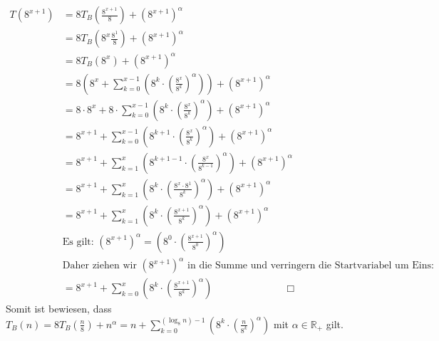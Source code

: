 \documentclass[a4paper]{scrartcl}
\begin{document}
\begin{align*}
T(8^{x+1})&=8T_B(\frac{8^{x+1}}{8})+(8^{x+1})^{\alpha}\\
&=8T_B(8^x\frac{8^{1}}{8})+(8^{x+1})^{\alpha}\\
&=8T_B(8^x)+(8^{x+1})^{\alpha}\\
&=8(8^{x} + \sum_{k=0}^{x-1} (8^k \cdot (\frac{8^x}{8^k})^{\alpha}))+(8^{x+1})^{\alpha}\\
&=8\cdot8^{x} + 8 \cdot \sum_{k=0}^{x-1} (8^k \cdot (\frac{8^x}{8^k})^{\alpha})+(8^{x+1})^{\alpha}\\
&=8^{x+1} + \sum_{k=0}^{x-1} (8^{k+1} \cdot (\frac{8^x}{8^k})^{\alpha})+(8^{x+1})^{\alpha}\\
&=8^{x+1} + \sum_{k=1}^{x} (8^{k+1-1} \cdot (\frac{8^x}{8^{k-1}})^{\alpha})+(8^{x+1})^{\alpha}\\
&=8^{x+1} + \sum_{k=1}^{x} (8^{k} \cdot (\frac{8^x\cdot 8^1}{8^{k}})^{\alpha})+(8^{x+1})^{\alpha}\\
&=8^{x+1} + \sum_{k=1}^{x} (8^{k} \cdot (\frac{8^{x+1}}{8^{k}})^{\alpha})+(8^{x+1})^{\alpha}\\
& \textrm{Es gilt: } (8^{x+1})^{\alpha}=(8^{0} \cdot (\frac{8^{x+1}}{8^{0}})^{\alpha})\\
&\textrm{Daher ziehen wir } (8^{x+1})^{\alpha} \textrm{ in die Summe und verringern die Startvariabel um Eins:}\\
&=8^{x+1} + \sum_{k=0}^{x} (8^{k} \cdot (\frac{8^{x+1}}{8^{k}})^{\alpha}) \hspace{3cm} \Box
\end{align*}
Somit ist bewiesen, dass $T_B(n)=8T_B(\frac{n}{8})+n^{\alpha}=n + \sum_{k=0}^{(\log_{8}n)-1} (8^k \cdot (\frac{n}{8^k})^{\alpha})$ mit $\alpha \in \mathbb{R}_+$ gilt.
\end{document}
